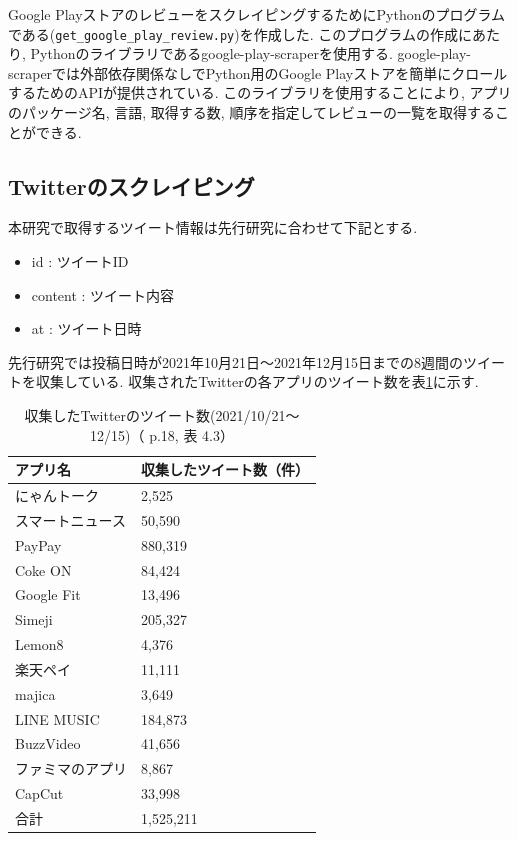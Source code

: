 Google PlayストアのレビューをスクレイピングするためにPythonのプログラムである(\verb|get_google_play_review.py|)を作成した. このプログラムの作成にあたり, Pythonのライブラリであるgoogle-play-scraperを使用する. google-play-scraperでは外部依存関係なしでPython用のGoogle Playストアを簡単にクロールするためのAPIが提供されている\cite{google-play-scraper}. 
このライブラリを使用することにより, アプリのパッケージ名, 言語, 取得する数, 順序を指定してレビューの一覧を取得することができる. 


\subsection{Twitterのスクレイピング}
\label{sec:x}
本研究で取得するツイート情報は先行研究\cite{kawatsura}に合わせて下記とする. 
\begin{itemize}
 \item id : ツイートID
 \item content : ツイート内容
 \item at : ツイート日時
\end{itemize}

先行研究では投稿日時が2021年10月21日〜2021年12月15日までの8週間のツイートを収集している. 収集されたTwitterの各アプリのツイート数を表\ref{tb:rawtweetnum}に示す. 

\begin{table}[htbp]
  \caption{収集したTwitterのツイート数(2021/10/21〜12/15)（\cite{kawatsura} p.18, 表 4.3）}
  \label{tb:rawtweetnum}
  \begin{center}
  \begin{tabular}{l|l}
    \hline
    アプリ名&収集したツイート数（件）\\\hline\hline
    にゃんトーク&2,525\\\hline
    スマートニュース&50,590\\\hline
    PayPay&880,319\\\hline
    Coke ON&84,424\\\hline
    Google Fit&13,496\\\hline
    Simeji&205,327\\\hline
    Lemon8&4,376\\\hline
    楽天ペイ&11,111\\\hline
    majica&3,649\\\hline
    LINE MUSIC&184,873\\\hline
    BuzzVideo&41,656\\\hline
    ファミマのアプリ&8,867\\\hline
    CapCut&33,998\\\hline\hline
    合計&1,525,211
  \end{tabular}\end{center}
\end{table}

